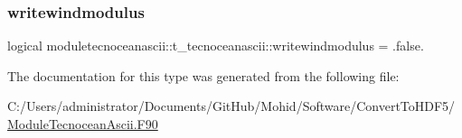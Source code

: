 \subsubsection{\texorpdfstring{writewindmodulus}{writewindmodulus}}
{\footnotesize\ttfamily logical moduletecnoceanascii\+::t\+\_\+tecnoceanascii\+::writewindmodulus = .false.\hspace{0.3cm}{\ttfamily [private]}}



The documentation for this type was generated from the following file\+:\begin{DoxyCompactItemize}
\item 
C\+:/\+Users/administrator/\+Documents/\+Git\+Hub/\+Mohid/\+Software/\+Convert\+To\+H\+D\+F5/\mbox{\hyperlink{_module_tecnocean_ascii_8_f90}{Module\+Tecnocean\+Ascii.\+F90}}\end{DoxyCompactItemize}
